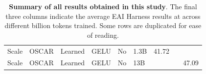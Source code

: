 \documentclass[11pt]{article}
\begin{document}
\begin{table}[h]
\begin{center}
\begin{small}
{\begin{tabular}{lllllllll}
Scale           & OSCAR    & Learned   & GELU       & No             & 1.3B       & 41.72 &       &       \\
Scale           & OSCAR    & Learned   & GELU       & No             & 13B        &       &       & 47.09\\
\bottomrule
\end{tabular}}
\end{small}
\end{center}
\caption{\textbf{Summary of all results obtained in this study}. The final three columns indicate the average EAI Harness results at across different billion tokens trained. Some rows are duplicated for ease of reading.}

\label{tab:all_results}
\end{table}
\end{document}
